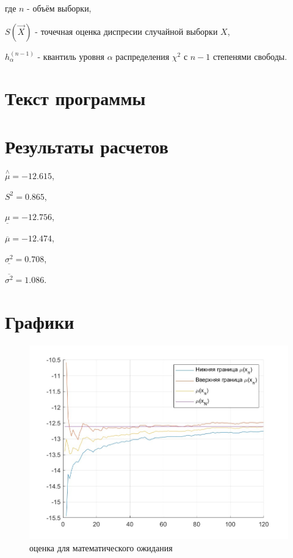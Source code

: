 где $n$ - объём выборки, 

$S(\vec{X})$ - точечная оценка диспресии случайной выборки $X$,

$h^{(n-1)}_{\alpha}$ - квантиль уровня $\alpha$ распределения $\chi^2$ с $n-1$ степенями свободы.

\newpage
\section*{Текст программы}

\newpage
\section*{Результаты расчетов}

$\stackrel{\wedge}{\mu} = -12.615$,

$S^2 = 0.865$,

$\underline{\mu} = -12.756$,

$\overline{\mu} = -12.474$,

$\underline{\sigma^2} = 0.708$,

$\overline{\sigma^2} = 1.086$.

\section*{Графики}
\begin{figure}[h]
	\includegraphics[width=1\linewidth]{inc/img/g1}
	\caption{оценка для математического ожидания}
\end{figure}

